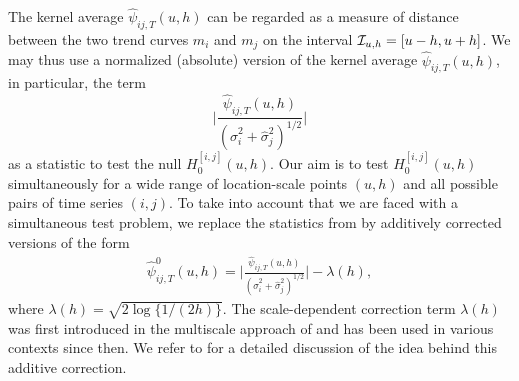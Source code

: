 \documentclass[a4paper,12pt]{article}
\makeatletter
\renewcommand{\eqref}[1]{\tagform@{\ref{#1}}}
\makeatother
\begin{document}
The kernel average $\widehat{\psi}_{ij, T}(u, h)$ can be regarded as a measure of distance between the two trend curves $m_i$ and $m_j$ on the interval $\mathcal{I}_{u, h} = [u-h, u+h]$. We may thus use a normalized (absolute) version of the kernel average $\widehat{\psi}_{ij, T}(u, h)$, in particular, the term 
\begin{equation}\label{eq:local-stat-without-correction}
\Big| \frac{\widehat{\psi}_{ij, T}(u, h)}{(\widehat{\sigma}_i^2 + \widehat{\sigma}_j^2)^{1/2}} \Big|
\end{equation}
as a statistic to test the null $H_0^{[i, j]}(u, h)$. 
Our aim is to test $H_0^{[i, j]}(u, h)$ simultaneously for a wide range of location-scale points $(u,h)$ and all possible pairs of time series $(i,j)$. To take into account that we are faced with a simultaneous test problem, we replace the statistics from \eqref{eq:local-stat-without-correction} by additively corrected versions of the form 
\begin{align}\label{eq:psi_zero_ij}
\widehat{\psi}^0_{ij, T}(u, h) =  \Big|\frac{\widehat{\psi}_{ij, T}(u, h)}{(\widehat{\sigma}_i^2 + \widehat{\sigma}_j^2)^{1/2}}\Big| - \lambda(h),
\end{align}
where $\lambda(h) = \sqrt{2 \log \{ 1/(2h) \}}$. The scale-dependent correction term $\lambda(h)$ was first introduced in the multiscale approach of \cite{DuembgenSpokoiny2001} and has been used in various contexts since then. We refer to \citet{KhismatullinaVogt2020} for a detailed discussion of the idea behind this additive correction. 
\end{document}
